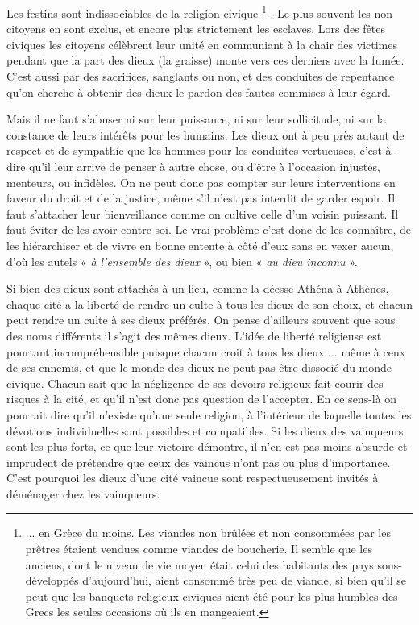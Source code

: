  Les festins sont indissociables de la religion civique%
\footnote{... en Grèce du moins. Les viandes non brûlées et non consommées par les prêtres étaient vendues comme viandes de boucherie. Il semble que les anciens, dont le niveau de vie moyen était celui des habitants des pays sous-développés d'aujourd'hui, aient consommé très peu de viande, si bien qu'il se peut que les banquets religieux civiques aient été pour les plus humbles des Grecs les seules occasions où ils en mangeaient.}%
. Le plus souvent les non citoyens en sont exclus, et encore plus strictement les esclaves. Lors des fêtes civiques les citoyens célèbrent leur unité en communiant à la chair des victimes pendant que la part des dieux (la graisse) monte vers ces derniers avec la fumée. C'est aussi par des sacrifices, sanglants ou non, et des conduites de repentance qu'on cherche à obtenir des dieux le pardon des fautes commises à leur égard. 

 Mais il ne faut s'abuser ni sur leur puissance, ni sur leur sollicitude, ni sur la constance de leurs intérêts pour les humains. Les dieux ont à peu près autant de respect et de sympathie que les hommes pour les conduites vertueuses, c'est-à-dire qu'il leur arrive de penser à autre chose, ou d'être à l'occasion injustes, menteurs, ou infidèles. On ne peut donc pas compter sur leurs interventions en faveur du droit et de la justice, même s'il n'est pas interdit de garder espoir. Il faut s'attacher leur bienveillance comme on cultive celle d'un voisin puissant. Il faut éviter de les avoir contre soi. Le vrai problème c'est donc de les connaître, de les hiérarchiser et de vivre en bonne entente à côté d'eux sans en vexer aucun, d'où les autels « \emph{à l'ensemble des dieux} », ou bien « \emph{au dieu inconnu} ». 

 Si bien des dieux sont attachés à un lieu, comme la déesse Athéna à Athènes, chaque cité a la liberté de rendre un culte à tous les dieux de son choix, et chacun peut rendre un culte à ses dieux préférés. On pense d'ailleurs souvent que sous des noms différents il s'agit des mêmes dieux. L'idée de liberté religieuse est pourtant incompréhensible puisque chacun croit à tous les dieux ... même à ceux de ses ennemis, et que le monde des dieux ne peut pas être dissocié du monde civique. Chacun sait que la négligence de ses devoirs religieux fait courir des risques à la cité, et qu'il n'est donc pas question de l'accepter. En ce sens-là on pourrait dire qu'il n'existe qu'une seule religion, à l'intérieur de laquelle toutes les dévotions individuelles sont possibles et compatibles. Si les dieux des vainqueurs sont les plus forts, ce que leur victoire démontre, il n'en est pas moins absurde et imprudent de prétendre que ceux des vaincus n'ont pas ou plus d'importance. C'est pourquoi les dieux d'une cité vaincue sont respectueusement invités à déménager chez les vainqueurs. 

